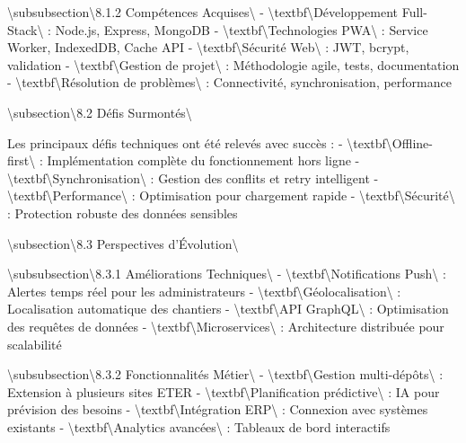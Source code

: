 \documentclass[12pt,a4paper]{report}
\begin{document}
\textbackslash{}subsubsection\textbackslash{}{8.1.2 Compétences Acquises\textbackslash{}}
- \textbackslash{}textbf\textbackslash{}{Développement Full-Stack\textbackslash{}} : Node.js, Express, MongoDB
- \textbackslash{}textbf\textbackslash{}{Technologies PWA\textbackslash{}} : Service Worker, IndexedDB, Cache API
- \textbackslash{}textbf\textbackslash{}{Sécurité Web\textbackslash{}} : JWT, bcrypt, validation
- \textbackslash{}textbf\textbackslash{}{Gestion de projet\textbackslash{}} : Méthodologie agile, tests, documentation
- \textbackslash{}textbf\textbackslash{}{Résolution de problèmes\textbackslash{}} : Connectivité, synchronisation, performance

\textbackslash{}subsection\textbackslash{}{8.2 Défis Surmontés\textbackslash{}}

Les principaux défis techniques ont été relevés avec succès :
- \textbackslash{}textbf\textbackslash{}{Offline-first\textbackslash{}} : Implémentation complète du fonctionnement hors ligne
- \textbackslash{}textbf\textbackslash{}{Synchronisation\textbackslash{}} : Gestion des conflits et retry intelligent
- \textbackslash{}textbf\textbackslash{}{Performance\textbackslash{}} : Optimisation pour chargement rapide
- \textbackslash{}textbf\textbackslash{}{Sécurité\textbackslash{}} : Protection robuste des données sensibles

\textbackslash{}subsection\textbackslash{}{8.3 Perspectives d'Évolution\textbackslash{}}

\textbackslash{}subsubsection\textbackslash{}{8.3.1 Améliorations Techniques\textbackslash{}}
- \textbackslash{}textbf\textbackslash{}{Notifications Push\textbackslash{}} : Alertes temps réel pour les administrateurs
- \textbackslash{}textbf\textbackslash{}{Géolocalisation\textbackslash{}} : Localisation automatique des chantiers
- \textbackslash{}textbf\textbackslash{}{API GraphQL\textbackslash{}} : Optimisation des requêtes de données
- \textbackslash{}textbf\textbackslash{}{Microservices\textbackslash{}} : Architecture distribuée pour scalabilité

\textbackslash{}subsubsection\textbackslash{}{8.3.2 Fonctionnalités Métier\textbackslash{}}
- \textbackslash{}textbf\textbackslash{}{Gestion multi-dépôts\textbackslash{}} : Extension à plusieurs sites ETER
- \textbackslash{}textbf\textbackslash{}{Planification prédictive\textbackslash{}} : IA pour prévision des besoins
- \textbackslash{}textbf\textbackslash{}{Intégration ERP\textbackslash{}} : Connexion avec systèmes existants
- \textbackslash{}textbf\textbackslash{}{Analytics avancées\textbackslash{}} : Tableaux de bord interactifs
\end{document}
